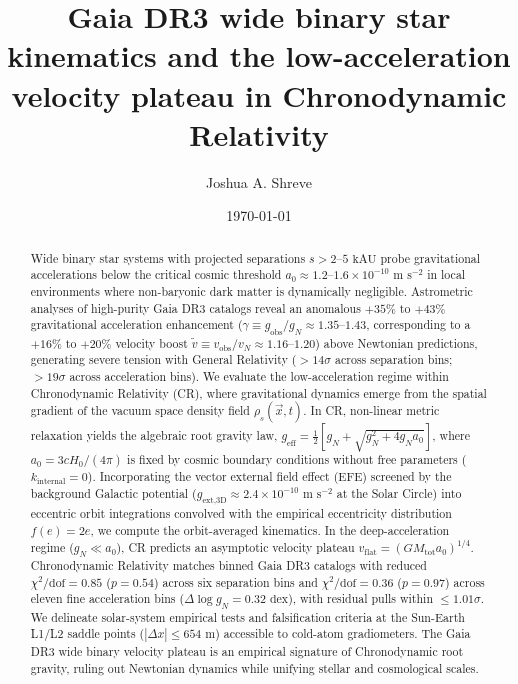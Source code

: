 \documentclass[aps,prd,reprint,superscriptaddress,nofootinbib,floatfix,amsmath,amssymb]{revtex4-2}
\begin{document}
\title{Gaia DR3 wide binary star kinematics and the low-acceleration velocity plateau in Chronodynamic Relativity}

\author{Joshua A. Shreve}

\date{\today}

\begin{abstract}
Wide binary star systems with projected separations $s > 2\text{--}5\text{ kAU}$ probe gravitational accelerations below the critical cosmic threshold $a_0 \approx 1.2\text{--}1.6 \times 10^{-10}\text{ m s}^{-2}$ in local environments where non-baryonic dark matter is dynamically negligible. Astrometric analyses of high-purity Gaia DR3 catalogs reveal an anomalous $+35\%$ to $+43\%$ gravitational acceleration enhancement ($\gamma \equiv g_{\text{obs}}/g_N \approx 1.35\text{--}1.43$, corresponding to a $+16\%$ to $+20\%$ velocity boost $\tilde{v} \equiv v_{\text{obs}}/v_N \approx 1.16\text{--}1.20$) above Newtonian predictions, generating severe tension with General Relativity ($>14\sigma$ across separation bins; $>19\sigma$ across acceleration bins). We evaluate the low-acceleration regime within Chronodynamic Relativity (CR), where gravitational dynamics emerge from the spatial gradient of the vacuum space density field $\rho_s(\vec{x}, t)$. In CR, non-linear metric relaxation yields the algebraic root gravity law, $g_{\text{eff}} = \frac{1}{2}[g_N + \sqrt{g_N^2 + 4 g_N a_0}]$, where $a_0 = 3 c H_0 / (4\pi)$ is fixed by cosmic boundary conditions without free parameters ($k_{\text{internal}} = 0$). Incorporating the vector external field effect (EFE) screened by the background Galactic potential ($g_{\text{ext,3D}} \approx 2.4 \times 10^{-10}\text{ m s}^{-2}$ at the Solar Circle) into eccentric orbit integrations convolved with the empirical eccentricity distribution $f(e) = 2e$, we compute the orbit-averaged kinematics. In the deep-acceleration regime ($g_N \ll a_0$), CR predicts an asymptotic velocity plateau $v_{\text{flat}} = (G M_{\text{tot}} a_0)^{1/4}$. Chronodynamic Relativity matches binned Gaia DR3 catalogs with reduced $\chi^2/\text{dof} = 0.85$ ($p = 0.54$) across six separation bins and $\chi^2/\text{dof} = 0.36$ ($p = 0.97$) across eleven fine acceleration bins ($\Delta\log g_N = 0.32\text{ dex}$), with residual pulls within $\le 1.01\sigma$. We delineate solar-system empirical tests and falsification criteria at the Sun-Earth L1/L2 saddle points ($|\Delta x| \le 654\text{ m}$) accessible to cold-atom gradiometers. The Gaia DR3 wide binary velocity plateau is an empirical signature of Chronodynamic root gravity, ruling out Newtonian dynamics while unifying stellar and cosmological scales.
\end{abstract}
\end{document}
